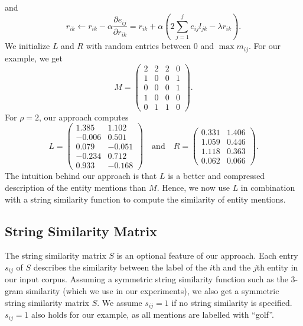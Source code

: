 and
\begin{equation}
r_{ik} \leftarrow r_{ik} - \alpha \frac{\partial e_{ij}}{\partial r_{ik}} = r_{ik} + \alpha \left(2 \sum\limits_{j=1}^j e_{ij}l_{jk} - \lambda r_{ik} \right).
\end{equation}
We initialize $L$ and $R$ with random entries between 0 and $\max m_{ij}$.
For our example, we get
\begin{equation}
M = \left(
\begin{matrix}
 2 & 2 & 2 & 0 \\
 1 & 0 & 0 & 1 \\
 0 & 0 & 0 & 1 \\
 1 & 0 & 0 & 0 \\
 0 & 1 & 1 & 0
\end{matrix} \right).
\end{equation}
For $\rho=2$, our approach computes
\begin{equation}
L = \left(
\begin{matrix}
  1.385 & 1.102 \\
 -0.006 & 0.501  \\
  0.079 & -0.051  \\
 -0.234 & 0.712 \\
  0.933 & -0.168
\end{matrix} \right)
\quad \text{and} \quad R = \left(
\begin{matrix}
 0.331 & 1.406 \\
 1.059 & 0.446 \\
 1.118 & 0.363 \\
 0.062 & 0.066
\end{matrix} \right).
\end{equation}
The intuition behind our approach is that $L$ is a better and compressed description of the entity mentions than $M$.
Hence, we now use $L$ in combination with a string similarity function to compute the similarity of entity mentions.

\subsection{String Similarity Matrix}
The string similarity matrix $S$ is an optional feature of our approach.
Each entry $s_{ij}$ of $S$ describes the similarity between the label of the $i$th and the $j$th entity in our input corpus.
Assuming a symmetric string similarity function such as the 3-gram similarity (which we use in our experiments), 
we also get a symmetric string similarity matrix $S$.
We assume $s_{ij} = 1$ if no string similarity is specified.
$s_{ij} = 1$ also holds for our example, as all mentions are labelled with ``golf''.

